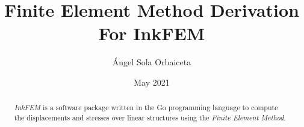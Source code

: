 \documentclass[12pt, letterpaper]{article}
\title{Finite Element Method Derivation For InkFEM}
\author{\'Angel Sola Orbaiceta}
\date{May 2021}
\begin{document}
\maketitle

\begin{abstract}
  \emph{InkFEM} is a software package written in the Go programming language to compute the displacements and stresses over linear structures using the \emph{Finite Element Method}.
\end{abstract}


\end{document}
